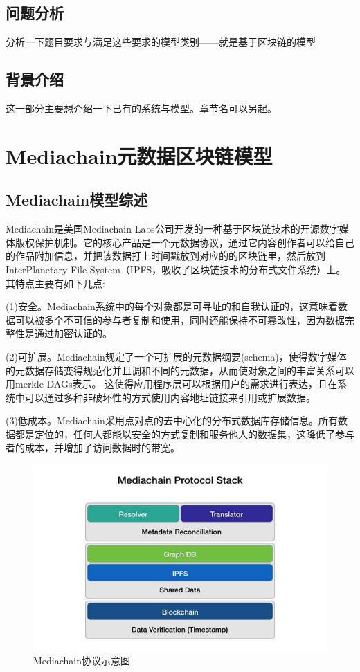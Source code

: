 \documentclass[withoutpreface,bwprint]{cumcmthesis} %
\begin{document}
\subsection{问题分析}
分析一下题目要求与满足这些要求的模型类别——就是基于区块链的模型
\subsection{背景介绍}
这一部分主要想介绍一下已有的系统与模型。章节名可以另起。

\section{Mediachain元数据区块链模型}

\subsection{Mediachain模型综述}
Mediachain是美国Mediachain Labs公司开发的一种基于区块链技术的开源数字媒体版权保护机制。它的核心产品是一个元数据协议，通过它内容创作者可以给自己的作品附加信息，并把该数据打上时间戳放到对应的的区块链里，然后放到InterPlanetary File System（IPFS，吸收了区块链技术的分布式文件系统）上。其特点主要有如下几点:

(1)安全。Mediachain系统中的每个对象都是可寻址的和自我认证的，这意味着数据可以被多个不可信的参与者复制和使用，同时还能保持不可篡改性，因为数据完整性是通过加密认证的。

(2)可扩展。Mediachain规定了一个可扩展的元数据纲要(schema)，使得数字媒体的元数据存储变得规范化并且调和不同的元数据，从而使对象之间的丰富关系可以用merkle DAGs表示。
这使得应用程序层可以根据用户的需求进行表达，且在系统中可以通过多种非破坏性的方式使用内容地址链接来引用或扩展数据。

(3)低成本。Mediachain采用点对点的去中心化的分布式数据库存储信息。所有数据都是定位的，任何人都能以安全的方式复制和服务他人的数据集，这降低了参与者的成本，并增加了访问数据时的带宽。

\begin{figure}[!h]
	\centering
	\includegraphics[width=.8\textwidth]{mediachain.jpg}
	\caption{Mediachain协议示意图}
\end{figure}
\end{document}
